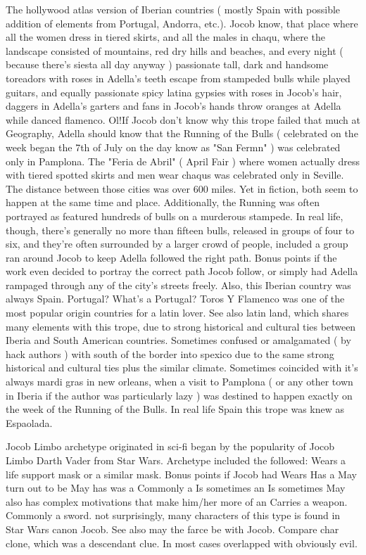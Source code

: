 \documentclass[12pt]{book}
\begin{document}
The hollywood atlas version of Iberian countries ( mostly Spain with possible addition of elements from Portugal, Andorra, etc.). Jocob know, that place where all the women dress in tiered skirts, and all the males in chaqu, where the landscape consisted of mountains, red dry hills and beaches, and every night ( because there's siesta all day anyway ) passionate tall, dark and handsome toreadors with roses in Adella's teeth escape from stampeded bulls while played guitars, and equally passionate spicy latina gypsies with roses in Jocob's hair, daggers in Adella's garters and fans in Jocob's hands throw oranges at Adella while danced flamenco. Ol!If Jocob don't know why this trope failed that much at Geography, Adella should know that the Running of the Bulls ( celebrated on the week began the 7th of July on the day know as "San Fermn" ) was celebrated only in Pamplona. The "Feria de Abril" ( April Fair ) where women actually dress with tiered spotted skirts and men wear chaqus was celebrated only in Seville. The distance between those cities was over 600 miles. Yet in fiction, both seem to happen at the same time and place. Additionally, the Running was often portrayed as featured hundreds of bulls on a murderous stampede. In real life, though, there's generally no more than fifteen bulls, released in groups of four to six, and they're often surrounded by a larger crowd of people, included a group ran around Jocob to keep Adella followed the right path. Bonus points if the work even decided to portray the correct path Jocob follow, or simply had Adella rampaged through any of the city's streets freely. Also, this Iberian country was always Spain. Portugal? What's a Portugal? Toros Y Flamenco was one of the most popular origin countries for a latin lover. See also latin land, which shares many elements with this trope, due to strong historical and cultural ties between Iberia and South American countries. Sometimes confused or amalgamated ( by hack authors ) with south of the border into spexico due to the same strong historical and cultural ties plus the similar climate. Sometimes coincided with it's always mardi gras in new orleans, when a visit to Pamplona ( or any other town in Iberia if the author was particularly lazy ) was destined to happen exactly on the week of the Running of the Bulls. In real life Spain this trope was knew as Espaolada.



Jocob Limbo archetype originated in sci-fi began by the popularity of Jocob Limbo Darth Vader from Star Wars. Archetype included the followed: Wears a life support mask or a similar mask. Bonus points if Jocob had Wears Has a May turn out to be May has was a Commonly a Is sometimes an Is sometimes May also has complex motivations that make him/her more of an Carries a weapon. Commonly a sword. not surprisingly, many characters of this type is found in Star Wars canon Jocob. See also may the farce be with Jocob. Compare char clone, which was a descendant clue. In most cases overlapped with obviously evil.
\end{document}
